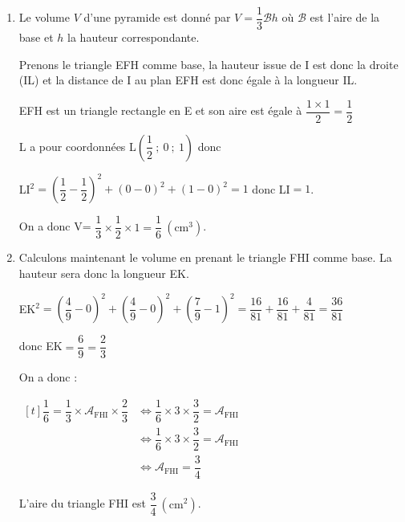 \documentclass[10pt]{article}
\begin{document}
\begin{enumerate}
\begin{enumerate}
Le seul point de la droite étant aussi sur le plan est donc K, c'est le point de paramètre $\dfrac{4}{9}$ dans l'équation paramétrique de $(\mathrm{EJ})$.

		Ses coordonnées vérifient :

		$x_\mathrm{K}=\dfrac{4}{9}$, \quad $y_\mathrm{K}=\dfrac{4}{9}$ \quad et \quad $z_\mathrm{K}=1- \dfrac{1}{2} \times \dfrac{4}{9}=1-\dfrac{2}{9}=\dfrac{7}{9}$.

		Le projeté orthogonal  du point E sur le plan (FHI) est le point K de coordonnées K$\left( \dfrac{4}{9} ~;~  \dfrac{4}{9} ~;~ \dfrac{7}{9} \right)$.


		\item  Le volume $V$ d'une pyramide est donné par  $V=\dfrac{1}{3}\mathcal{B}h$  où  $\mathcal{B}$ est l'aire de la base et $h$ la hauteur correspondante.

		Prenons le triangle EFH comme base, la hauteur issue de  I est donc la droite (IL) et la distance de I au plan EFH est donc égale à la longueur IL.

		EFH est un triangle rectangle en E et son aire est égale à $\dfrac{ 1\times 1}{2}=\dfrac{1}{2}$

		L a pour coordonnées  L$\left(\dfrac{1}{2}~;~ 0~;~1 \right)$   donc

		LI$^2= \left( \dfrac{1}{2} -\dfrac{1}{2}   \right)^2 + (0-0)^2 + (1-0)^2= 1 $ donc LI$=1$.

		On a donc V= $\dfrac{1}{3} \times \dfrac{1}{2} \times 1 = \dfrac{1}{6}~\left(\text{cm}^3\right)$.


		\item  Calculons maintenant le volume en prenant le triangle FHI comme base. La hauteur sera donc la longueur EK.

		EK$^2=    \left( \dfrac{4}{9} -0   \right)^2 + \left( \dfrac{4}{9} -0  \right)^2 + \left( \dfrac{7}{9} -1  \right)^2  = \dfrac{16}{81}+ \dfrac{16}{81}+\dfrac{4}{81}  = \dfrac{36}{81}$

		donc EK$=\dfrac{6}{9}=\dfrac{2}{3}$

		On a donc :

		$\begin{aligned}[t] \dfrac{1}{6}=\dfrac{1}{3}\times \mathcal{A}_{\mathrm{FHI}}\times \dfrac{2}{3}
		&\iff \dfrac{1}{6} \times 3 \times\dfrac{3}{2} =  \mathcal{A}_{\mathrm{FHI}} \\
		&\iff \dfrac{1}{6} \times 3 \times\dfrac{3}{2} =  \mathcal{A}_{\mathrm{FHI}} \\
		&\iff  \mathcal{A}_{\mathrm{FHI}}=\dfrac{3}{4}\end{aligned}$


		L'aire du triangle FHI est	$ \dfrac{3}{4}~\left(\text{cm}^2\right)$.
	\end{enumerate}
\end{enumerate}

\bigskip
\end{document}
